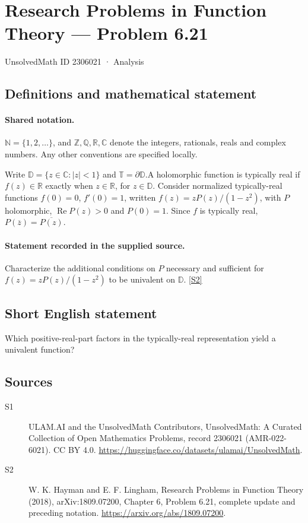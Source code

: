 \documentclass[11pt]{article}
\newcommand{\sref}[2]{\hyperlink{source:#1:#2}{[S#2]}}
\begin{document}
\setcounter{section}{2306020}
\section{Research Problems in Function Theory — Problem 6.21}\label{2306021}
{\small\sffamily UnsolvedMath ID 2306021 · Analysis}
\subsection{Definitions and mathematical statement}

\paragraph{Shared notation.}$\mathbb N=\{1,2,\ldots\}$, and $\mathbb Z,\mathbb Q,\mathbb R,\mathbb C$ denote the integers, rationals, reals and complex numbers. Any other conventions are specified locally.


Write $\mathbb D=\{z\in\mathbb C:|z|<1\}$ and $\mathbb T=\partial\mathbb D$.A holomorphic function is typically real if $f(z)\in\mathbb R$ exactly when $z\in\mathbb R$, for $z\in\mathbb D$. Consider normalized typically-real functions $f(0)=0$, $f'(0)=1$, written $f(z)=zP(z)/(1-z^2)$, with $P$ holomorphic, $\operatorname{Re}P(z)>0$ and $P(0)=1$. Since $f$ is typically real, $P(\overline z)=\overline{P(z)}$.
\paragraph{Statement recorded in the supplied source.}
Characterize the additional conditions on $P$ necessary and sufficient for $f(z)=zP(z)/(1-z^2)$ to be univalent on $\mathbb D$. \sref{2306021}{2}
\subsection{Short English statement}
Which positive-real-part factors in the typically-real representation yield a univalent function?
\subsection{Sources}
\begin{description}
\item[\hypertarget{source:2306021:1}{S1}] ULAM.AI and the UnsolvedMath Contributors, UnsolvedMath: A Curated Collection of Open Mathematics Problems, record 2306021 (AMR-022-6021). CC BY 4.0. \url{https://huggingface.co/datasets/ulamai/UnsolvedMath}.
\item[\hypertarget{source:2306021:2}{S2}] W. K. Hayman and E. F. Lingham, Research Problems in Function Theory (2018), arXiv:1809.07200, Chapter 6, Problem 6.21, complete update and preceding notation. \url{https://arxiv.org/abs/1809.07200}.
\end{description}
\label{end:2306021}
\end{document}
